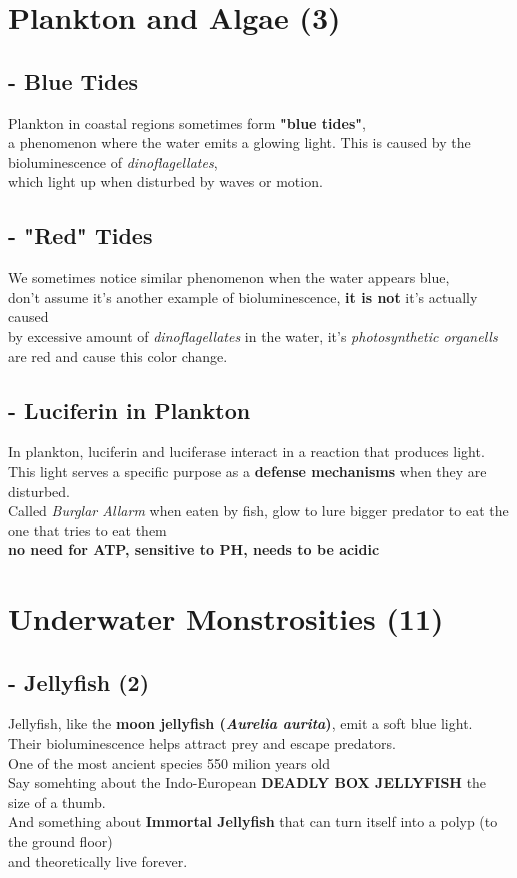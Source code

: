 \documentclass{article}
\begin{document}
\section*{Plankton and Algae (3)}

\subsection*{- Blue Tides }
Plankton in coastal regions sometimes form \textbf{"blue tides"},\\ 
a phenomenon where the water emits a glowing light. This is caused by the bioluminescence of \textit{dinoflagellates}, \\
which light up when disturbed by waves or motion.

\subsection*{- "Red" Tides }
We sometimes notice similar phenomenon when the water appears blue,\\
don't assume it's another example of bioluminescence, \textbf{it is not} it's actually caused\\
by excessive amount of \textit{dinoflagellates} in the water, it's \textit{photosynthetic organells} are red and cause this color change.

\subsection*{- Luciferin in Plankton }
In plankton, luciferin and luciferase interact in a reaction that produces light.\\ 
This light serves a specific purpose as a \textbf{defense mechanisms} when they are disturbed.\\
Called \textit{Burglar Allarm} when eaten by fish, glow to lure bigger predator to eat the one that tries to eat them\\
\textbf{no need for ATP, sensitive to PH, needs to be acidic}



\section*{Underwater Monstrosities (11)}

\subsection*{- Jellyfish (2)}
Jellyfish, like the \textbf{moon jellyfish (\textit{Aurelia aurita})}, emit a soft blue light.\\ 
Their bioluminescence helps attract prey and escape predators.\\
One of the most ancient species 550 milion years old\\
Say somehting about the Indo-European \textbf{DEADLY BOX JELLYFISH} the size of a thumb.\\
And something about \textbf{Immortal Jellyfish} that can turn itself into a polyp (to the ground floor) \\
and  theoretically live forever.
\end{document}
